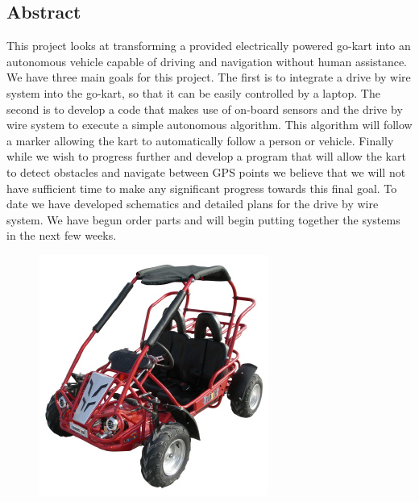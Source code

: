 \begin{center}\section*{Abstract}\end{center}
\thispagestyle{empty}

This project looks at transforming a provided electrically powered go-kart into an autonomous vehicle capable of driving and navigation without human assistance. We have three main goals for this project. The first is to integrate a drive by wire system into the go-kart, so that it can be easily controlled by a laptop. The second is to develop a code that makes use of on-board sensors and the drive by wire system to execute a simple autonomous algorithm. This algorithm will follow a marker allowing the kart to automatically follow a person or vehicle. Finally while we wish to progress further and develop a program that will allow the kart to detect obstacles and navigate between GPS points we believe that we will not have sufficient time to make any significant progress towards this final goal. To date we have developed schematics and detailed plans for the drive by wire system. We have begun order parts and will begin putting together the systems in the next few weeks.

\vfill
  \begin{figure}[h]
    \centering
    \includegraphics{../../Images/hh80h.jpg}
    \label{gokart}
  \end{figure}



